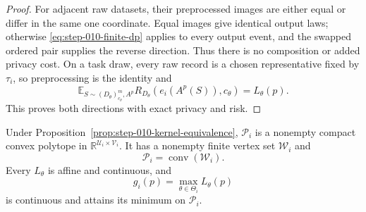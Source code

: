 \begin{proof}
For adjacent raw datasets, their preprocessed images are either equal or
differ in the same one coordinate.  Equal images give identical output
laws; otherwise \eqref{eq:step-010-finite-dp} applies to every output
event, and the swapped ordered pair supplies the reverse direction.  Thus
there is no composition or added privacy cost.  On a task draw, every raw
record is a chosen representative fixed by \(\tau_i\), so preprocessing is
the identity and
\begin{equation}\label{eq:step-010-extension-payoff}
\mathbb E_{S\sim(D_\theta)_{c_\theta}^m,A^p}
R_{D_\theta}(e_i(A^p(S)),c_\theta)
=L_\theta(p).
\end{equation}
This proves both directions with exact privacy and risk.
\end{proof}

\begin{lemma}
\label{lem:step-010-compact-game}
Under Proposition~\ref{prop:step-010-kernel-equivalence},
\(\mathcal P_i\) is a nonempty compact convex polytope in
\(\mathbb R^{\mathcal U_i\times\mathcal V_i}\).  It has a nonempty finite
vertex set \(\mathcal W_i\) and
\begin{equation}\label{eq:step-010-vertex-hull}
\mathcal P_i=\operatorname{conv}(\mathcal W_i).
\end{equation}
Every \(L_\theta\) is affine and continuous, and
\begin{equation}\label{eq:step-010-worst-task-payoff}
g_i(p)=\max_{\theta\in\Theta_i}L_\theta(p)
\end{equation}
is continuous and attains its minimum on \(\mathcal P_i\).
\end{lemma}

